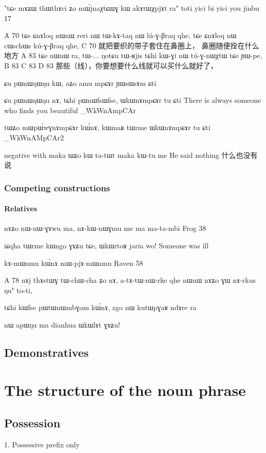 \documentclass[oldfontcommands,oneside,a4paper,11pt]{memoir}
\newcommand{\ipa}[1]{{\phon #1}} %
\newcommand{\wav}[1]{}%
\begin{document}
"tɕe mɤʑɯ thɯthɤci ʑo mɯ́jnaχtɕɯɣ kɯ akɤtɯχpjɤt ra" toti
yici bi yici you jinbu 17


A	70	tɕe	ɕnɤloq	nɯnɯ	reri	nɯ	tɯ-kɤ-taq	nɯ	lú-ɣ-βraq	qhe,	tɕe	ɕnɤloq	nɯ	cɯschɯs	kú-ɣ-βraq	qhe,
C	70	就把要织的带子套住在鼻圈上， 鼻圈随便拴在什么地方
A	83	tɕe	nɯnɯ	ra,	tɯ-...	ŋotɕu	tɯ-ʁjis	tɕhi	kɯ-ɣi	nɯ	tú-ɣ-nɯχtɯ	tɕe	ɲɯ-pe,
B	83
C	83
D	83	那些（线），你要想要什么线就可以买什么就好了，

ɕu pɯnɯŋɯŋu kɯ, aʑo amu mpɕɤr ɲɯsɯsɤm ɕti

ɕu pɯnɯŋɯŋu nɤ, tɕhi pɯnɯfsɯfse, ɯkɯnɤmpɕɤr tu ɕti
There is always someone who finds you beautiful
\ipa{8_WkWnAmpCAr}

tɯʑo mɯpɯ́wɣnɤmpɕɤr kɯ́nɤ, kɯmaʁ tɯrme ɯkɯnɤmpɕɤr tu ɕti
\ipa{8_WkWnAMpCAr2}



negative with maka
ɯʑo kɯ ta-tɯt maka kɯ-tu me
He said nothing 什么也没有说
\subsection{Competing constructions}

\subsubsection{Relatives}
nɤʑo	nɯ-nɯ-ɣɤwu	ma,	nɤ-kɯ-nɯɣmu	me	ma	ma-ta-mbi
Frog 38


iɕqha tɯrme kɯngo ɣɤʑu tɕe, ɯkɯrtoʁ jaria wo!
Someone was ill \wav{8_kWngoGAZu}


	kɤ-mɯnmu	kɯ́nɤ	mɯ-pjɤ-mɯnmu				
	Raven 58


A	78	nɤj	thɤstɯɣ	tɯ-chɯ-cha	ʑo	nɤ,	a-tɤ-tɯ-nɯ-rke	qhe	nɯnɯ	nɤʑo	ɣɯ	nɤ-rkus	ŋu"	to-ti,


tɕhi kɯfse pɯtɯnɯmbɣom kɯ́nɤ, zgo nɯ kutɯpɣaʁ ndɤre ra
\wav{8_kutWnWmbGom}

nɯ apɯŋu ma dianhua ɯkɯlɤt ɣɤʑu!
\wav{WkWlAt}

\section{Demonstratives} \label{sec:demonstratives}
\chapter{The structure of the noun phrase} \label{chapt:noun.phrase}

\section{Possession} \label{sec:possession}
1. Possessive prefix only
\end{document}
